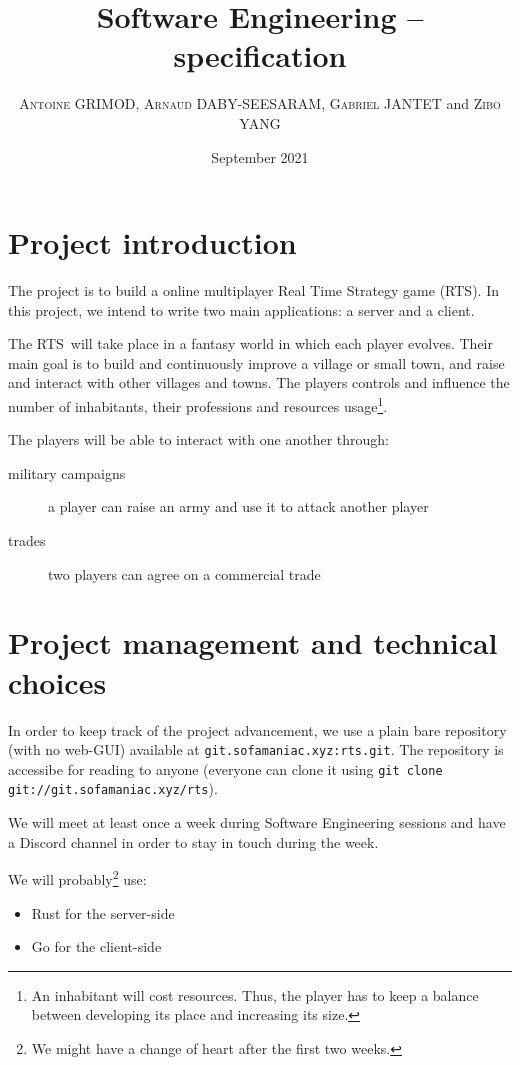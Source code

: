 \documentclass{article}
\title{Software Engineering -- specification}
\author{%
	\textsc{Antoine GRIMOD},
	\textsc{Arnaud DABY-SEESARAM},
	\textsc{Gabriel JANTET} and
	\textsc{Zibo YANG}}
\date{September 2021}
\newif\ifrts
\def\rts{\ifrts RTS\else Real Time Strategy game (RTS)\rtstrue\fi}
\begin{document}
\maketitle

\section{Project introduction}
The project is to build a online multiplayer \rts. In this project, we intend to write
two main applications: a server and a client.

The \rts~will take place in a fantasy world in which each player evolves.
Their main goal is to build and continuously improve a village or small town,
and raise and interact with other villages and towns.
The players controls and influence the number of inhabitants, their professions
and resources usage\footnote{An inhabitant will cost resources. Thus, the player
has to keep a balance between developing its place and increasing its size.}.
\medskip

The players will be able to interact with one another through:
\begin{description}
	\item[military campaigns] a player can raise an army and use it to attack
	another player
	\item[trades] two players can agree on a commercial trade
\end{description}



\section{Project management and technical choices}
In order to keep track of the project advancement, we use a plain bare
repository (with no web-GUI) available at \texttt{git.sofamaniac.xyz:rts.git}.
The repository is accessibe for reading to anyone (everyone can clone it
using \texttt{git clone git://git.sofamaniac.xyz/rts}).

We will meet at least once a week during Software Engineering sessions and have
a Discord channel in order to stay in touch during the week.
\medskip

We will probably\footnote{We might have a change of heart after the first two
weeks.} use:
\begin{itemize}
	\item Rust for the server-side
	\item Go for the client-side
\end{itemize}
\end{document}
